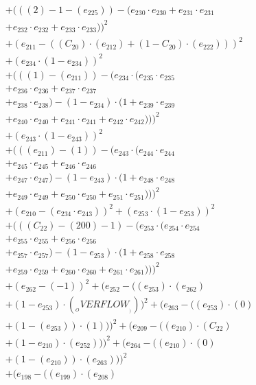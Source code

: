 \documentclass[10pt, a4paper]{article}
\begin{document}
\begin{small}
\begin{align*}
& + (((2) - 1 - (e_{225})) - (e_{230} \cdot e_{230} + e_{231} \cdot e_{231} \\
& + e_{232} \cdot e_{232} + e_{233} \cdot e_{233}))^{2} \\
& + (e_{211} - ((C_{20})  \cdot  (e_{212}) + (1 - C_{20})  \cdot  (e_{222})))^{2} \\
& + (e_{234} \cdot (1 - e_{234}))^{2} \\
& + (((1) - (e_{211})) - (e_{234} \cdot (e_{235} \cdot e_{235} \\
& + e_{236} \cdot e_{236} + e_{237} \cdot e_{237} \\
& + e_{238} \cdot e_{238}) - (1 - e_{234}) \cdot (1 + e_{239} \cdot e_{239} \\
& + e_{240} \cdot e_{240} + e_{241} \cdot e_{241} + e_{242} \cdot e_{242})))^{2} \\
& + (e_{243} \cdot (1 - e_{243}))^{2} \\
& + (((e_{211}) - (1)) - (e_{243} \cdot (e_{244} \cdot e_{244} \\
& + e_{245} \cdot e_{245} + e_{246} \cdot e_{246} \\
& + e_{247} \cdot e_{247}) - (1 - e_{243}) \cdot (1 + e_{248} \cdot e_{248} \\
& + e_{249} \cdot e_{249} + e_{250} \cdot e_{250} + e_{251} \cdot e_{251})))^{2} \\
& + (e_{210} - (e_{234} \cdot e_{243}))^{2} + (e_{253} \cdot (1 - e_{253}))^{2} \\
& + (((C_{22}) - (200) - 1) - (e_{253} \cdot (e_{254} \cdot e_{254} \\
& + e_{255} \cdot e_{255} + e_{256} \cdot e_{256} \\
& + e_{257} \cdot e_{257}) - (1 - e_{253}) \cdot (1 + e_{258} \cdot e_{258} \\
& + e_{259} \cdot e_{259} + e_{260} \cdot e_{260} + e_{261} \cdot e_{261})))^{2} \\
& + (e_{262} - (-1))^{2} + (e_{252} - ((e_{253})  \cdot  (e_{262}) \\
& + (1 - e_{253})  \cdot  (__OVERFLOW__)))^{2} + (e_{263} - ((e_{253}) \cdot (0) \\
& + (1 - (e_{253})) \cdot (1)))^{2} + (e_{209} - ((e_{210})  \cdot  (C_{22}) \\
& + (1 - e_{210})  \cdot  (e_{252})))^{2} + (e_{264} - ((e_{210}) \cdot (0) \\
& + (1 - (e_{210})) \cdot (e_{263})))^{2} \\
& + (e_{198} - ((e_{199})  \cdot  (e_{208}) \\

\end{align*}
\end{small}
\end{document}
